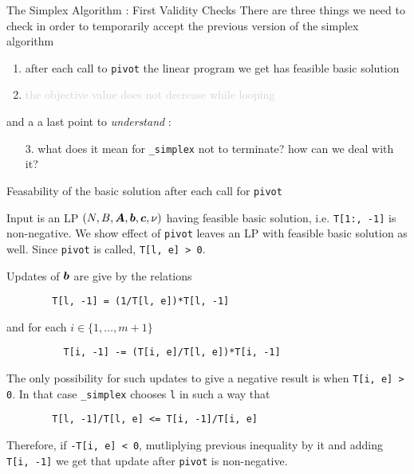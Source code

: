 \documentclass[aspectratio = 169]{beamer}
\begin{document}
\begin{frame}{The Simplex Algorithm : First Validity Checks}
  There are three things we need to check in order to temporarily
  accept the previous version of the simplex algorithm
    \begin{enumerate}
        \item
          after each call to \texttt{pivot} the linear
          program we get has feasible basic solution
        \item
          \textcolor<3>{lightgray}{the objective value does not
            decrease while looping}
    \end{enumerate}
    and a a last point to \textit{understand} :
    \begin{enumerate}
        \item[3.]
          what does it mean for \texttt{_simplex} not to terminate? how
          can we deal with it?
    \end{enumerate}
\end{frame}

\begin{frame}[fragile]{Feasability of the basic solution after each call for \texttt{pivot}}
    \setlength\columnseprule{.1pt}
    \begin{multicols}{2}
      Input is an LP $(N, B, \boldsymbol{A}, \boldsymbol{b}, \boldsymbol{c}, \nu)$ having
      feasible basic solution, i.e. \texttt{T[1:, -1]} is
      non-negative. We show effect of \texttt{pivot}
      leaves an LP with feasible basic solution as well. Since
      \texttt{pivot} is called, \texttt{T[l, e] > 0}.

      \pause
      Updates of $\boldsymbol{b}$ are give by the relations
      \small{
      \begin{verbatim}
        T[l, -1] = (1/T[l, e])*T[l, -1]
      \end{verbatim}
      }
      and for each $i \in \{1, \ldots, m+1\}$
      \small{
        \begin{verbatim}
          T[i, -1] -= (T[i, e]/T[l, e])*T[i, -1]
        \end{verbatim}
      }
      \pause
      The only possibility for such updates to give a negative result
      is when \texttt{T[i, e] > 0}. In that case
      \texttt{_simplex} chooses \texttt{l} in such a
      way that
      \small{
      \begin{verbatim}
        T[l, -1]/T[l, e] <= T[i, -1]/T[i, e]
      \end{verbatim}
      }
      \pause
      Therefore, if \texttt{-T[i, e] < 0}, mutliplying
      previous inequality by it and adding \texttt{T[i, -1]}
      we get that update after \texttt{pivot} is
      non-negative.
    \end{multicols}
\end{frame}
\end{document}
